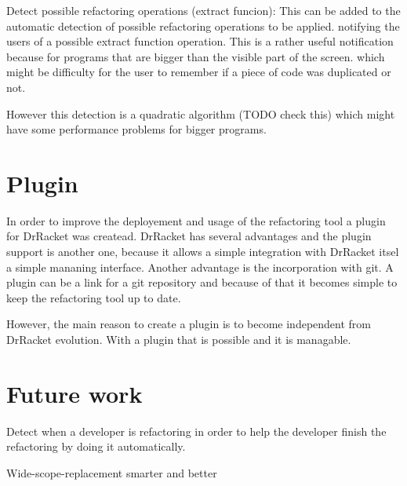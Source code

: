 Detect possible refactoring operations (extract funcion):
This can be added to the automatic detection of possible refactoring operations
to be applied. notifying the users of a possible extract function operation.
This is a rather useful notification because for programs that are bigger than the
visible part of the screen. which might be difficulty for the user to remember
if a piece of code was duplicated or not.

However this detection is a quadratic algorithm (TODO check this) which might
have some performance problems for bigger programs.

\section{Plugin}
In order to improve the deployement and usage of the refactoring tool a plugin
for DrRacket was createad.
DrRacket has several advantages and the plugin support is another one, because
it allows a simple integration with DrRacket itsel a simple mananing interface.
Another advantage is the incorporation with git. A plugin can be a link for a git
repository and because of that it becomes simple to keep the refactoring tool up to date.

However, the main reason to create a plugin is to become independent from DrRacket
evolution. With a plugin that is possible and it is managable.


\section{Future work}
Detect when a developer is refactoring in order to help the developer finish the
refactoring by doing it automatically.

Wide-scope-replacement smarter and better
